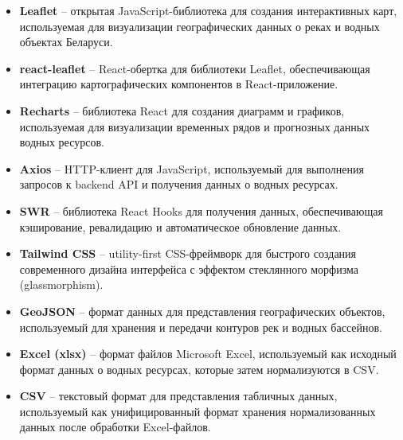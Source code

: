 \begin{itemize}
    \item \textbf{Leaflet} -- открытая JavaScript-библиотека для создания интерактивных карт, используемая для визуализации географических данных о реках и водных объектах Беларуси.
    
    \item \textbf{react-leaflet} -- React-обертка для библиотеки Leaflet, обеспечивающая интеграцию картографических компонентов в React-приложение.
    
    \item \textbf{Recharts} -- библиотека React для создания диаграмм и графиков, используемая для визуализации временных рядов и прогнозных данных водных ресурсов.
    
    \item \textbf{Axios} -- HTTP-клиент для JavaScript, используемый для выполнения запросов к backend API и получения данных о водных ресурсах.
    
    \item \textbf{SWR} -- библиотека React Hooks для получения данных, обеспечивающая кэширование, ревалидацию и автоматическое обновление данных.
    
    \item \textbf{Tailwind CSS} -- utility-first CSS-фреймворк для быстрого создания современного дизайна интерфейса с эффектом стеклянного морфизма (glassmorphism).
    
    \item \textbf{GeoJSON} -- формат данных для представления географических объектов, используемый для хранения и передачи контуров рек и водных бассейнов.
    
    \item \textbf{Excel (xlsx)} -- формат файлов Microsoft Excel, используемый как исходный формат данных о водных ресурсах, которые затем нормализуются в CSV.
    
    \item \textbf{CSV} -- текстовый формат для представления табличных данных, используемый как унифицированный формат хранения нормализованных данных после обработки Excel-файлов.
\end{itemize}

